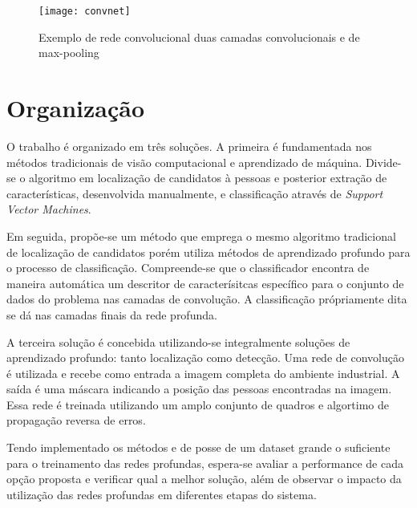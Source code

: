 \begin{figure}[h]
\caption{Exemplo de rede convolucional duas camadas convolucionais e de max-pooling}
\centering
\texttt{[image: convnet]}
\label{fig:convnet}
\end{figure}

\section{Organização}
O trabalho é organizado em três soluções. A primeira é fundamentada nos métodos tradicionais de visão computacional e aprendizado de máquina. Divide-se o algoritmo em localização de candidatos à pessoas e posterior extração de características, desenvolvida manualmente, e classificação através de \textit{Support Vector Machines}.

Em seguida, propõe-se um método que emprega o mesmo algoritmo tradicional de localização de candidatos porém utiliza métodos de aprendizado profundo para o processo de classificação. Compreende-se que o classificador encontra de maneira automática um descritor de caracterísitcas específico para o conjunto de dados do problema nas camadas de convolução. A classificação própriamente dita se dá nas camadas finais da rede profunda.

A terceira solução é concebida utilizando-se integralmente soluções de aprendizado profundo: tanto localização como detecção. Uma rede de convolução é utilizada e recebe como entrada a imagem completa do ambiente industrial. A saída é uma máscara indicando a posição das pessoas encontradas na imagem. Essa rede é treinada utilizando um amplo conjunto de quadros e algortimo de propagação reversa de erros.

Tendo implementado os métodos e de posse de um dataset grande o suficiente para o treinamento das redes profundas, espera-se avaliar a performance de cada opção proposta e verificar qual a melhor solução, além de observar o impacto da utilização das redes profundas em diferentes etapas do sistema.




